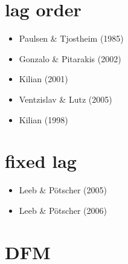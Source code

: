 \documentclass[12pt,twoside]{reedthesis}
\providecommand{\tightlist}{%
  \setlength{\itemsep}{0pt}\setlength{\parskip}{0pt}}
\begin{document}
\hypertarget{lag-order}{%
\section{lag order}\label{lag-order}}
\begin{itemize}
\tightlist
\item
  Paulsen \& Tjostheim (1985)
\item
  Gonzalo \& Pitarakis (2002)
\item
  Kilian (2001)
\item
  Ventzislav \& Lutz (2005)
\item
  Kilian (1998)
\end{itemize}
\hypertarget{fixed-lag}{%
\section{fixed lag}\label{fixed-lag}}
\begin{itemize}
\tightlist
\item
  Leeb \& Pötscher (2005)
\item
  Leeb \& Pötscher (2006)
\end{itemize}
\hypertarget{dfm}{%
\section{DFM}\label{dfm}}
\end{document}
